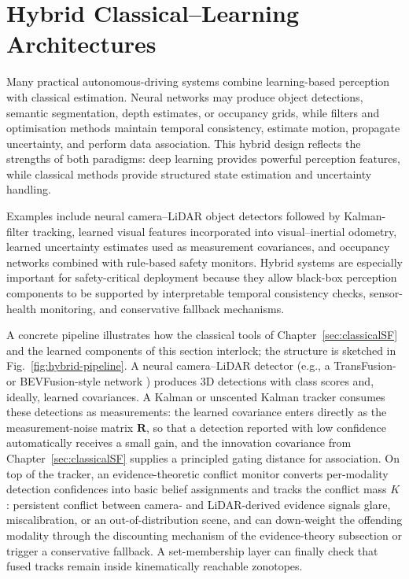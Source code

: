 \section{Hybrid Classical--Learning Architectures}

Many practical autonomous-driving systems combine learning-based perception with classical estimation. Neural networks may produce object detections, semantic segmentation, depth estimates, or occupancy grids, while filters and optimisation methods maintain temporal consistency, estimate motion, propagate uncertainty, and perform data association. This hybrid design reflects the strengths of both paradigms: deep learning provides powerful perception features, while classical methods provide structured state estimation and uncertainty handling.

Examples include neural camera--LiDAR object detectors followed by Kalman-filter tracking, learned visual features incorporated into visual--inertial odometry, learned uncertainty estimates used as measurement covariances, and occupancy networks combined with rule-based safety monitors. Hybrid systems are especially important for safety-critical deployment because they allow black-box perception components to be supported by interpretable temporal consistency checks, sensor-health monitoring, and conservative fallback mechanisms.


A concrete pipeline illustrates how the classical tools of Chapter~\ref{sec:classicalSF} and the learned components of this section interlock; the structure is sketched in Fig.~\ref{fig:hybrid-pipeline}. A neural camera--LiDAR detector (e.g., a TransFusion- or BEVFusion-style network \cite{bai2022_transfusion,liu2023_bevfusion}) produces 3D detections with class scores and, ideally, learned covariances. A Kalman or unscented Kalman tracker consumes these detections as measurements: the learned covariance enters directly as the measurement-noise matrix $\mathbf{R}$, so that a detection reported with low confidence automatically receives a small gain, and the innovation covariance from Chapter~\ref{sec:classicalSF} supplies a principled gating distance for association. On top of the tracker, an evidence-theoretic conflict monitor converts per-modality detection confidences into basic belief assignments and tracks the conflict mass $K$: persistent conflict between camera- and LiDAR-derived evidence signals glare, miscalibration, or an out-of-distribution scene, and can down-weight the offending modality through the discounting mechanism of the evidence-theory subsection or trigger a conservative fallback. A set-membership layer can finally check that fused tracks remain inside kinematically reachable zonotopes.

